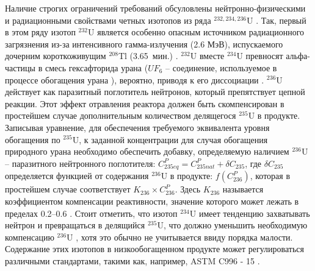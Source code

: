 Наличие строгих ограничений требований обсуловлены нейтронно-физическими и радиационными свойствами четных изотопов из ряда $^{232,234,236}$U \cite{smirnovEvolutionIsotopicComposition2012, proselkovAnalizVozmozhnostiIspolzovaniya2003, dudnikovInfluence236UEfficacy2016}. Так, первый в этом ряду изотоп $^{232}$U является особенно опасным источником радиационного загрязнения из-за интенсивного гамма-излучения (2.6 МэВ), испускаемого дочерним короткоживущим $^{208}$Tl (3.65 мин.) \cite{article}.
$^{232}$U вместе $^{234}$U превносят альфа-частицы в смесь гексафторида урана ($UF_6$ -- соединение, используемое в процессе обогащения урана \cite{orlovWayObtainUranium2015, orlovDesublimationPurificationTransporting2017}), вероятно, приводя к его диссоциации \cite{kryuchkovObogashchennyyUranDobavleniem2007, bernhardtRadiationEffectsAlpha1958}. $^{236}$U действует как паразитный поглотитель нейтронов, который препятствует цепной реакции. Этот эффект отравления реактора должен быть скомпенсирован в простейшем случае дополнительным количеством делящегося $^{235}$U в продукте. Записывая уравнение, для обеспечения требуемого эквивалента уровня обогащения по $^{235}$U, к заданной концентрации для случая обогащения природного урана необходимо обеспечить добавку, определяемую наличием $^{236}$U -- паразитного нейтронного поглотителя:
$C_{235 e q}^{P}=C_{235 n a t}^{P}+\delta C_{235}$, где $\delta C_{235}$ определяется функцией от содержания $^{236}$U в продукте:
$f\left(C_{236}^{P}\right)$, которая в простейшем случае соответствует $K_{236} \times C_{236}^{P}$. Здесь $K_{236}$ называется коэффициентом компенсации реактивности, значение которого может лежать в пределах 0.2--0.6 \cite{delagarzaMulticomponentIsotopeSeparation1961, delculAnalysisReuseUranium2009}. Стоит отметить, что изотоп $^{234}$U имеет тенденцию захватывать нейтрон и превращаться в делящийся $^{235}$U, что должно уменьшить необходимую компенсацию $^{236}$U \cite{dyachenkoIspolzovanieRegenerirovannogoUrana2012}, хотя это обычно не учитывается ввиду порядка малости. Содержание этих изотопов в низкообогащенном продукте может регулироваться различными стандартами, такими как, например, ASTM C996 - 15 \cite{c26committeeSpecificationUraniumHexafluoride}.

